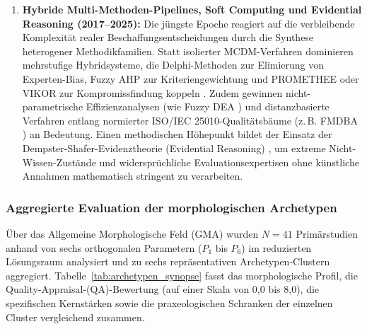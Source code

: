 \begin{enumerate}[label=\alph*)]
    \item \textbf{Hybride Multi-Methoden-Pipelines, Soft Computing und Evidential Reasoning (2017--2025):} Die jüngste Epoche reagiert auf die verbleibende Komplexität realer Beschaffungsentscheidungen durch die Synthese heterogener Methodikfamilien. Statt isolierter MCDM-Verfahren dominieren mehrstufige Hybridsysteme, die Delphi-Methoden zur Elimierung von Experten-Bias, Fuzzy AHP zur Kriteriengewichtung und PROMETHEE oder VIKOR zur Kompromissfindung koppeln \cite{NZJEEPAC, QNWK8SAP}. Zudem gewinnen nicht-parametrische Effizienzanalysen (wie Fuzzy DEA \cite{YVWGHAWQ}) und distanzbasierte Verfahren entlang normierter ISO/IEC 25010-Qualitätsbäume (z.\,B. FMDBA \cite{8KF4HAZS, FVINCQ89}) an Bedeutung. Einen methodischen Höhepunkt bildet der Einsatz der Dempster-Shafer-Evidenztheorie (Evidential Reasoning) \cite{LNQHES84}, um extreme Nicht-Wissen-Zustände und widersprüchliche Evaluationsexpertisen ohne künstliche Annahmen mathematisch stringent zu verarbeiten.
\end{enumerate}

\subsubsection{Aggregierte Evaluation der morphologischen Archetypen}

Über das Allgemeine Morphologische Feld (GMA) wurden $N = 41$ Primärstudien anhand von sechs orthogonalen Parametern ($P_1$ bis $P_6$) im reduzierten Lösungsraum analysiert und zu sechs repräsentativen Archetypen-Clustern aggregiert. Tabelle~\ref{tab:archetypen_synopse} fasst das morphologische Profil, die Quality-Appraisal-(QA)-Bewertung (auf einer Skala von 0,0 bis 8,0), die spezifischen Kernstärken sowie die praxeologischen Schranken der einzelnen Cluster vergleichend zusammen.

